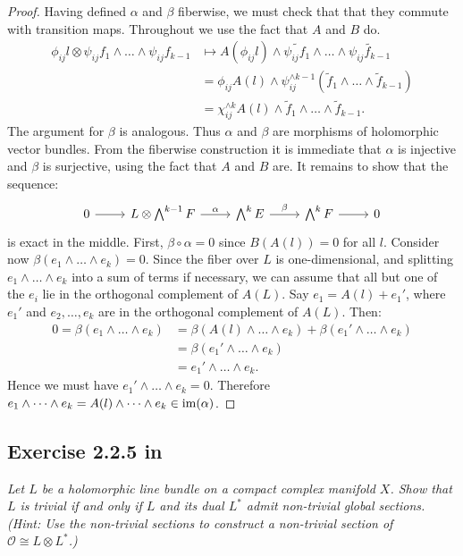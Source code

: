 \documentclass{article}
\begin{document}
\begin{proof}
Having defined $\alpha$ and $\beta$ fiberwise, we must check that that they commute with transition maps. Throughout
we use the fact that $A$ and $B$ do.
\begin{align*}
\phi_{ij} l \otimes \psi_{ij} f_1 \wedge \dots \wedge \psi_{ij} f_{k-1} &\mapsto A(\phi_{ij} l) \wedge
\widetilde{\psi_{ij} f_1} \wedge \dots \wedge \widetilde{\psi_{ij} f_{k-1}} \\
&= \phi_{ij} A(l) \wedge \psi_{ij}^{\wedge k-1}(\tilde f_1 \wedge \dots \wedge \tilde f_{k-1}) \\
&= \chi_{ij}^{\wedge k} A(l) \wedge \tilde f_1 \wedge \dots \wedge \tilde f_{k-1}.
\end{align*}
The argument for $\beta$ is analogous. Thus $\alpha$ and $\beta$ are morphisms of holomorphic vector bundles.
From the fiberwise construction it is immediate that $\alpha$ is injective and $\beta$ is surjective, using the
fact that $A$ and $B$ are. It remains to show that the sequence:
\[
\begin{tikzcd}
0\arrow{r} & L\otimes \bigwedge^{k-1} F \arrow{r}{\alpha} & \bigwedge^{k} E\arrow{r}{\beta} & \bigwedge^{k} 
F\arrow{r} & 0
\end{tikzcd}
\]
is exact in the middle. First, $\beta \circ \alpha = 0$ since $B(A(l)) = 0$ for all $l$. Consider now
$\beta(e_1 \wedge \dots \wedge e_k) = 0$. Since the fiber over $L$ is one-dimensional, and splitting 
$e_1 \wedge \dots \wedge e_k$ into a sum of terms if necessary, we can assume that all but one
of the $e_i$ lie in the orthogonal complement of $A(L)$. Say $e_1 = A(l) + e_1'$, where $e_1'$ and $e_2,
\dots, e_{k}$ are in the orthogonal complement of $A(L)$. Then:
\begin{align*}
0 = \beta(e_1 \wedge \dots \wedge e_k) &= \beta(A(l) \wedge \dots \wedge e_k) + \beta(e_1' \wedge \dots \wedge e_k) \\
&= \beta(e_1' \wedge \dots \wedge e_k) \\
&= e_1' \wedge \dots \wedge e_k.
\end{align*}
Hence we must have $e_1' \wedge \dots \wedge e_k = 0$. Therefore $e_1 \wedge \dots \wedge e_k = A(l) \wedge \dots 
\wedge e_k \in \operatorname{im}(\alpha)$.
\end{proof}


\subsection*{Exercise 2.2.5 in \cite{Huy}}
\emph{Let $L$ be a holomorphic line bundle on a compact complex manifold $X$. Show that $L$ is trivial if and
only if $L$ and its dual $L^*$ admit non-trivial global sections. (Hint: Use the non-trivial sections to construct
a non-trivial section of $\mathcal{O} \cong L \otimes L^*$.)}
\end{document}
